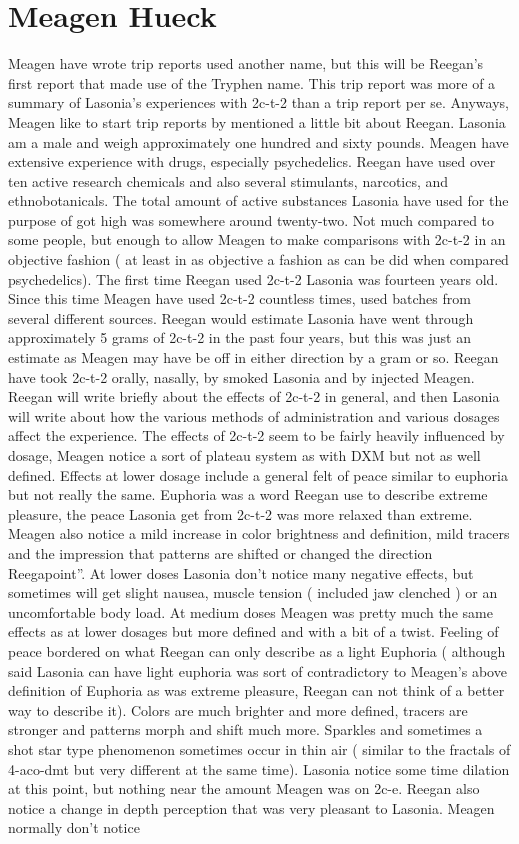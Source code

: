 \documentclass[12pt]{book}
\begin{document}
\chapter{Meagen Hueck}

Meagen have wrote trip reports used another name, but this will be Reegan's first report that made use of the Tryphen name. This trip report was more of a summary of Lasonia's experiences with 2c-t-2 than a trip report per se. Anyways, Meagen like to start trip reports by mentioned a little bit about Reegan. Lasonia am a male and weigh approximately one hundred and sixty pounds. Meagen have extensive experience with drugs, especially psychedelics. Reegan have used over ten active research chemicals and also several stimulants, narcotics, and ethnobotanicals. The total amount of active substances Lasonia have used for the purpose of got high was somewhere around twenty-two. Not much compared to some people, but enough to allow Meagen to make comparisons with 2c-t-2 in an objective fashion ( at least in as objective a fashion as can be did when compared psychedelics). The first time Reegan used 2c-t-2 Lasonia was fourteen years old. Since this time Meagen have used 2c-t-2 countless times, used batches from several different sources. Reegan would estimate Lasonia have went through approximately 5 grams of 2c-t-2 in the past four years, but this was just an estimate as Meagen may have be off in either direction by a gram or so. Reegan have took 2c-t-2 orally, nasally, by smoked Lasonia and by injected Meagen. Reegan will write briefly about the effects of 2c-t-2 in general, and then Lasonia will write about how the various methods of administration and various dosages affect the experience. The effects of 2c-t-2 seem to be fairly heavily influenced by dosage, Meagen notice a sort of plateau system as with DXM but not as well defined. Effects at lower dosage include a general felt of peace similar to euphoria but not really the same. Euphoria was a word Reegan use to describe extreme pleasure, the peace Lasonia get from 2c-t-2 was more relaxed than extreme. Meagen also notice a mild increase in color brightness and definition, mild tracers and the impression that patterns are shifted or changed the direction Reegapoint''. At lower doses Lasonia don't notice many negative effects, but sometimes will get slight nausea, muscle tension ( included jaw clenched ) or an uncomfortable body load. At medium doses Meagen was pretty much the same effects as at lower dosages but more defined and with a bit of a twist. Feeling of peace bordered on what Reegan can only describe as a light Euphoria ( although said Lasonia can have light euphoria was sort of contradictory to Meagen's above definition of Euphoria as was extreme pleasure, Reegan can not think of a better way to describe it). Colors are much brighter and more defined, tracers are stronger and patterns morph and shift much more. Sparkles and sometimes a shot star type phenomenon sometimes occur in thin air ( similar to the fractals of 4-aco-dmt but very different at the same time). Lasonia notice some time dilation at this point, but nothing near the amount Meagen was on 2c-e. Reegan also notice a change in depth perception that was very pleasant to Lasonia. Meagen normally don't notice 
\end{document}
